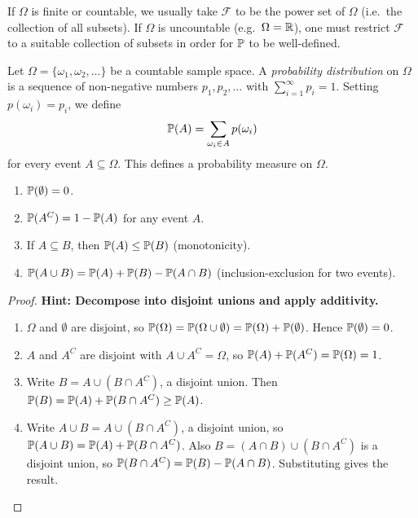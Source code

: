 \documentclass[a4paper]{article}
\begin{document}
\begin{remark}
  If $\Omega$ is finite or countable, we usually take $\mathcal{F}$ to be the power set of $\Omega$ (i.e.\ the collection of all subsets). If $\Omega$ is uncountable (e.g.\ $\Omega = \R$), one must restrict $\mathcal{F}$ to a suitable collection of subsets in order for $\P$ to be well-defined.
\end{remark}

\begin{defi}
  Let $\Omega = \{\omega_1, \omega_2, \dotsc\}$ be a countable sample space. A \emph{probability distribution} on $\Omega$ is a sequence of non-negative numbers $p_1, p_2, \dotsc$ with $\sum_{i = 1}^\infty p_i = 1$. Setting $p(\omega_i) = p_i$, we define
  \[
    \P(A) = \sum_{\omega_i\in A} p(\omega_i)
  \]
  for every event $A \subseteq \Omega$. This defines a probability measure on $\Omega$.
\end{defi}

\begin{prop}\leavevmode
  \begin{enumerate}
    \item $\P(\emptyset) = 0$.
    \item $\P(A^C) = 1 - \P(A)$ for any event $A$.
    \item If $A\subseteq B$, then $\P(A) \leq \P(B)$ (monotonicity).
    \item $\P (A\cup B) = \P(A) + \P(B) - \P(A\cap B)$ (inclusion-exclusion for two events).
  \end{enumerate}
\end{prop}

\begin{proof}
  \textbf{Hint: Decompose into disjoint unions and apply additivity.}
\leavevmode
  \begin{enumerate}
    \item $\Omega$ and $\emptyset$ are disjoint, so $\P(\Omega) = \P(\Omega \cup \emptyset) = \P(\Omega) + \P(\emptyset)$. Hence $\P(\emptyset) = 0$.
    \item $A$ and $A^C$ are disjoint with $A \cup A^C = \Omega$, so $\P(A) + \P(A^C) = \P(\Omega) = 1$.
    \item Write $B = A\cup (B\cap A^C)$, a disjoint union. Then $\P(B) = \P(A) + \P(B\cap A^C) \geq \P(A)$.
    \item Write $A\cup B = A\cup (B\cap A^C)$, a disjoint union, so $\P(A\cup B) = \P(A) + \P(B\cap A^C)$. Also $B = (A\cap B) \cup (B\cap A^C)$ is a disjoint union, so $\P(B\cap A^C) = \P(B) - \P(A\cap B)$. Substituting gives the result.\qedhere
  \end{enumerate}
\end{proof}
\end{document}
